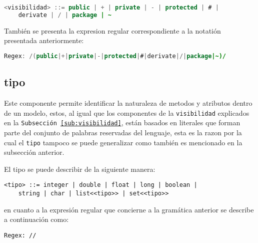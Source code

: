 \begin{lstlisting}[language=Java, basicstyle=\footnotesize\ttfamily]
  <visibilidad> ::= public | + | private | - | protected | # |
	derivate | / | package | ~
\end{lstlisting}

También se presenta la expresion regular correspondiente a la notatión
presentada anteriormente:

\begin{lstlisting}[language=Java, basicstyle=\footnotesize\ttfamily]
	Regex: /(public|+|private|-|protected|#|derivate|/|package|~)/
\end{lstlisting}

\subsection{tipo}
\label{sub:tipo}
Este componente permite identificar la naturaleza de metodos y atributos dentro
de un modelo, estos, al igual que los componentes de la \texttt{visibilidad}
explicados en la \texttt{Subsección \ref{sub:visibilidad}}, están basados en
literales que forman parte del conjunto de palabras reservadas del lenguaje,
esta es la razon por la cual el \texttt{tipo} tampoco se puede generalizar como
también es mencionado en la subsección anterior.

El tipo se puede describir de la siguiente manera:

\begin{lstlisting}[basicstyle=\footnotesize\ttfamily]
	<tipo> ::= integer | double | float | long | boolean |
	string | char | list<<tipo>> | set<<tipo>>
\end{lstlisting}

en cuanto a la expresión regular que concierne a la gramática anterior se
describe a continuación como:

\begin{lstlisting}[basicstyle=\footnotesize\ttfamily]
	Regex: //
\end{lstlisting}

